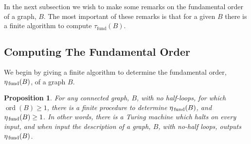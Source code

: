 \documentclass{memo-l}
\newcommand{\etafund}{{\eta_{\rm \,fund}}}
\theoremstyle{plain}
\newtheorem{proposition}[theorem]{Proposition}
\theoremstyle{definition}
\numberwithin{section}{chapter}
\numberwithin{equation}{chapter}
\DeclareMathOperator{\ord}{ord}
\newcommand{\taufund}{\tau_{\mathrm{fund}}}
\theoremstyle{plain}
\theoremstyle{definition}
\begin{document}
In the next subsection we wish to make some remarks on the
fundamental order of a graph, $B$.  The most important of these remarks
is that for a given $B$ there is a finite algorithm to compute
$\taufund(B)$.


\subsection{Computing The Fundamental Order}

We begin by giving a finite algorithm to determine the fundamental
order, $\etafund(B)$, of a graph $B$.

\begin{proposition}
For any connected graph, $B$, with no half-loops, for which
$\ord(B)\ge 1$, there is a finite procedure 
to determine $\etafund(B)$, and $\etafund(B)\ge 1$.
In other words, there is a Turing machine which halts on every input,
and when input the description of a graph, $B$, with no-half loops,
outputs $\etafund(B)$.
\end{proposition}
\end{document}
